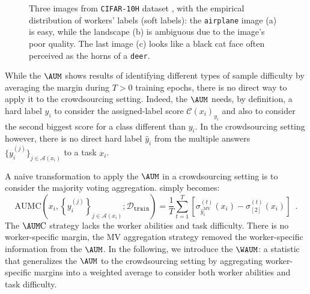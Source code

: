 \begin{figure}[thb]
\begin{minipage}{.3\linewidth}
    \end{minipage}
    \caption{Three images from \texttt{CIFAR-10H} dataset \citep{peterson_human_2019}, with the empirical distribution of workers' labels (soft labels): the \texttt{airplane} image (a) is easy, while the landscape (b) is ambiguous due to the image's poor quality. The last image (c) looks like a black cat face often perceived as the horns of a \texttt{deer}.}
    \label{fig:votes-c10h}
    \end{figure}

While the $\AUM$ shows results of identifying different types of sample difficulty by averaging the margin during $T>0$ training epochs, there is no direct way to apply it to the crowdsourcing setting.
Indeed, the $\AUM$ needs, by definition, a hard label $y_i$ to consider the assigned-label score $\mathcal{C}(x_i)_{y_i}$ and also to consider the second biggest score for a class different than $y_i$.
In the crowdsourcing setting however, there is no direct hard label $\hat y_i$ from the multiple answers $\{y_i^{(j)}\}_{j\in\mathcal{A}(x_i)}$ to a task $x_i$.


A naive transformation to apply the $\AUM$ in a crowdsourcing setting is to consider the majority voting aggregation.  simply becomes:
\begin{equation}\label{eq:aum_mv}
    \mathrm{AUMC}\left(x_i,\left\{y_i^{(j)}\right\}_{j\in\mathcal{A}(x_i)};\mathcal{D}_\texttt{train}\right) = \frac{1}{T}\sum_{t=1}^T \left[\sigma_{\hat y_i^{\mathrm{MV}}}^{(t)}(x_i) - \sigma_{[2]}^{(t)}(x_i)\right] \enspace.
\end{equation}
The $\AUM\mathrm{C}$ strategy lacks the worker abilities and task difficulty.
There is no worker-specific margin, the MV aggregation strategy removed the worker-specific information from the $\AUM$.
In the following, we introduce the $\WAUM$: a statistic that generalizes the $\AUM$ to the crowdsourcing setting by aggregating worker-specific margins into a weighted average to consider both worker abilities and task difficulty.

